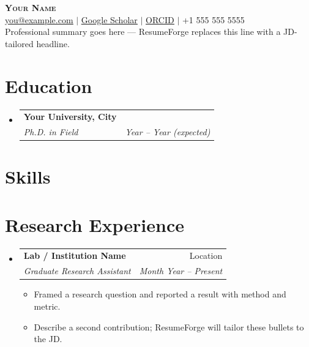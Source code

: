 \documentclass[letterpaper,10pt]{article}
\makeatletter
\newcommand{\resumeItem}[1]{
  \item{\small\setlength{\baselineskip}{11pt} #1 \vspace{-2pt}}
}
\newcommand{\resumeSubheading}[4]{
  \vspace{-2pt}\item
    \begin{tabular*}{\textwidth}[t]{@{}p{0.75\textwidth}@{\extracolsep{\fill}}r@{}}
      \textbf{#1} & \small #2 \\
      \textit{\small#3} & \textit{\small #4} \\
    \end{tabular*}\vspace{-4pt}
}
\newcommand{\resumeSubHeadingListStart}{\begin{itemize}[leftmargin=0in, label={}, topsep=0pt, partopsep=0pt]}
\newcommand{\resumeSubHeadingListEnd}{\end{itemize}}
\newcommand{\resumeItemListStart}{\begin{itemize}[leftmargin=0.15in, label={$\bullet$}, topsep=0pt, partopsep=0pt, itemsep=3pt, parsep=0pt]}
\newcommand{\resumeItemListEnd}{\end{itemize}}
\makeatother
\begin{document}
\fontsize{10.5}{12}\selectfont
\begin{center}
    {\Huge \scshape \textbf{Your Name}} \\ \vspace{4pt}
    \href{mailto:you@example.com}{\ul{you@example.com}} $|$
    \href{https://scholar.google.com/citations?user=XXXX}{\ul{Google Scholar}} $|$
    \href{https://orcid.org/0000-0000-0000-0000}{\ul{ORCID}} $|$
    +1 555 555 5555
    \\ \vspace{6pt}
    {Professional summary goes here — ResumeForge replaces this line with a JD-tailored headline.}
\end{center}
\section{Education}
\resumeSubHeadingListStart
  \resumeSubheading
    {Your University, City}{}
    {Ph.D. in Field}{\textit{Year -- Year (expected)}}
\resumeSubHeadingListEnd
\section{Skills}
\begin{itemize}[leftmargin=0in, label={}, topsep=0pt, partopsep=0pt]
  \small{\item{
  }}
\end{itemize}
\section{Research Experience}
\resumeSubHeadingListStart
  \resumeSubheading
    {Lab / Institution Name}{Location}
    {Graduate Research Assistant}{Month Year -- Present}
    \resumeItemListStart
      \resumeItem{Framed a research question and reported a result with method and metric.}
      \resumeItem{Describe a second contribution; ResumeForge will tailor these bullets to the JD.}
    \resumeItemListEnd
\resumeSubHeadingListEnd
\end{document}
